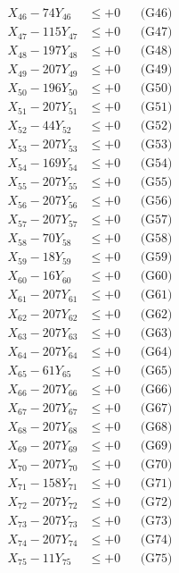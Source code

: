 \documentclass[a4paper,10pt]{article}
\begin{document}
{\begin{align}
X_{46} - 74Y_{46} &\leq +0 && \text{(G46)} \\
X_{47} - 115Y_{47} &\leq +0 && \text{(G47)} \\
X_{48} - 197Y_{48} &\leq +0 && \text{(G48)} \\
X_{49} - 207Y_{49} &\leq +0 && \text{(G49)} \\
X_{50} - 196Y_{50} &\leq +0 && \text{(G50)} \\
\allowbreak
X_{51} - 207Y_{51} &\leq +0 && \text{(G51)} \\
X_{52} - 44Y_{52} &\leq +0 && \text{(G52)} \\
X_{53} - 207Y_{53} &\leq +0 && \text{(G53)} \\
X_{54} - 169Y_{54} &\leq +0 && \text{(G54)} \\
X_{55} - 207Y_{55} &\leq +0 && \text{(G55)} \\
X_{56} - 207Y_{56} &\leq +0 && \text{(G56)} \\
X_{57} - 207Y_{57} &\leq +0 && \text{(G57)} \\
X_{58} - 70Y_{58} &\leq +0 && \text{(G58)} \\
X_{59} - 18Y_{59} &\leq +0 && \text{(G59)} \\
X_{60} - 16Y_{60} &\leq +0 && \text{(G60)} \\
\allowbreak
X_{61} - 207Y_{61} &\leq +0 && \text{(G61)} \\
X_{62} - 207Y_{62} &\leq +0 && \text{(G62)} \\
X_{63} - 207Y_{63} &\leq +0 && \text{(G63)} \\
X_{64} - 207Y_{64} &\leq +0 && \text{(G64)} \\
X_{65} - 61Y_{65} &\leq +0 && \text{(G65)} \\
X_{66} - 207Y_{66} &\leq +0 && \text{(G66)} \\
X_{67} - 207Y_{67} &\leq +0 && \text{(G67)} \\
X_{68} - 207Y_{68} &\leq +0 && \text{(G68)} \\
X_{69} - 207Y_{69} &\leq +0 && \text{(G69)} \\
X_{70} - 207Y_{70} &\leq +0 && \text{(G70)} \\
\allowbreak
X_{71} - 158Y_{71} &\leq +0 && \text{(G71)} \\
X_{72} - 207Y_{72} &\leq +0 && \text{(G72)} \\
X_{73} - 207Y_{73} &\leq +0 && \text{(G73)} \\
X_{74} - 207Y_{74} &\leq +0 && \text{(G74)} \\
X_{75} - 11Y_{75} &\leq +0 && \text{(G75)} \\

\end{align}}
\end{document}
